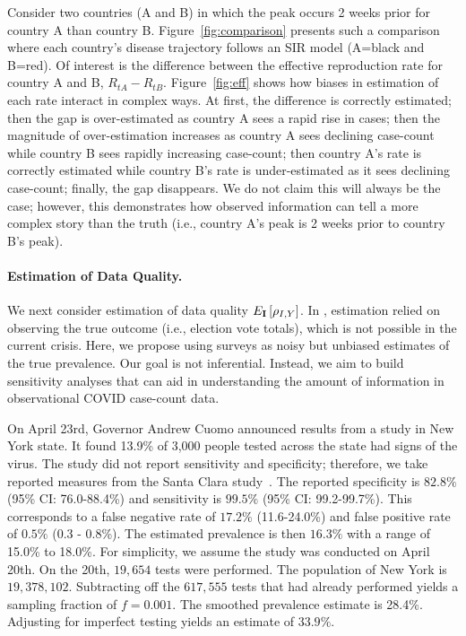 \documentclass[12pt]{article}
\def\I{{\bf I}}
\begin{document}
Consider two countries (A and B) in which the peak occurs 2 weeks prior for country A than country B.  Figure~\ref{fig:comparison} presents such a comparison where each country's disease trajectory follows an SIR model (A=black and B=red). Of interest is the difference between the effective reproduction rate for country A and B, $R_{tA} - R_{tB}$. Figure~\ref{fig:eff} shows how biases in estimation of each rate interact in complex ways.  At first, the difference is correctly estimated; then the gap is over-estimated as country A sees a rapid rise in cases; then the magnitude of over-estimation increases as country A sees declining case-count while country B sees rapidly increasing case-count; then country A's rate is correctly estimated while country B's rate is under-estimated as it sees declining case-count; finally, the gap disappears.  We do not claim this will always be the case; however, this demonstrates how observed information can tell a more complex story than the truth (i.e., country A's peak is 2 weeks prior to country B's peak).

\paragraph*{Estimation of Data Quality.} We next consider estimation of data quality $E_{\I} \left[ \rho_{I,Y} \right]$. In \cite{Meng2018}, estimation relied on observing the true outcome (i.e., election vote totals), which  is not possible in the current crisis.  Here, we propose using surveys as noisy but unbiased estimates of the true prevalence. Our goal is not inferential. Instead, we aim to build sensitivity analyses that can aid in understanding the amount of information in observational COVID case-count data.

On April 23rd, Governor Andrew Cuomo announced results from a study in New York state.  It found 13.9\% of 3,000 people tested across the state had signs of the virus.  The study did not report sensitivity and specificity; therefore, we take reported measures from the Santa Clara study~\cite{Bendavid2020}.  The reported specificity is $82.8\%$ (95\% CI: 76.0-88.4\%) and sensitivity is $99.5\%$ (95\% CI: 99.2-99.7\%).  This corresponds to a false negative rate of $17.2\%$ (11.6-24.0\%) and false positive rate of $0.5\%$ (0.3 - 0.8\%).  The estimated prevalence is then $16.3\%$ with a range of 15.0\% to 18.0\%. For simplicity, we assume the study was conducted on April 20th. On the 20th, $19,654$ tests were performed. The population of New York is $19,378,102$.   Subtracting off the $617,555$ tests that had already performed yields a sampling fraction of $f = 0.001$.  The smoothed prevalence estimate is 28.4\%.  Adjusting for imperfect testing yields an estimate of $33.9\%$.
\end{document}

